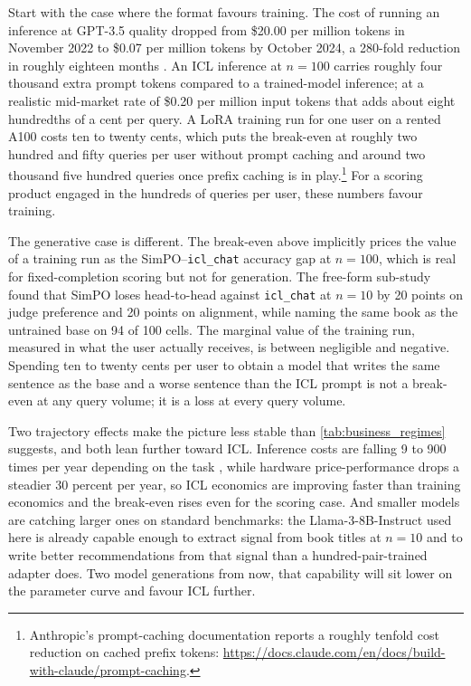 Start with the case where the format favours training. The cost of running an inference at GPT-3.5 quality dropped from \$20.00 per million tokens in November 2022 to \$0.07 per million tokens by October 2024, a 280-fold reduction in roughly eighteen months \citep{maslej2025aiindex}. An ICL inference at $n = 100$ carries roughly four thousand extra prompt tokens compared to a trained-model inference; at a realistic mid-market rate of \$0.20 per million input tokens that adds about eight hundredths of a cent per query. A LoRA training run for one user on a rented A100 costs ten to twenty cents, which puts the break-even at roughly two hundred and fifty queries per user without prompt caching and around two thousand five hundred queries once prefix caching is in play.\footnote{ Anthropic's prompt-caching documentation reports a roughly tenfold cost reduction on cached prefix tokens: \url{https://docs.claude.com/en/docs/build-with-claude/prompt-caching}.} For a scoring product engaged in the hundreds of queries per user, these numbers favour training.

The generative case is different. The break-even above implicitly prices the value of a training run as the SimPO--\texttt{icl\_chat} accuracy gap at $n = 100$, which is real for fixed-completion scoring but not for generation. The free-form sub-study found that SimPO loses head-to-head against \texttt{icl\_chat} at $n = 10$ by 20 points on judge preference and 20 points on alignment, while naming the same book as the untrained base on 94 of 100 cells. The marginal value of the training run, measured in what the user actually receives, is between negligible and negative. Spending ten to twenty cents per user to obtain a model that writes the same sentence as the base and a worse sentence than the ICL prompt is not a break-even at any query volume; it is a loss at every query volume.

Two trajectory effects make the picture less stable than \cref{tab:business_regimes} suggests, and both lean further toward ICL. Inference costs are falling 9 to 900 times per year depending on the task \citep{maslej2025aiindex}, while hardware price-performance drops a steadier 30 percent per year, so ICL economics are improving faster than training economics and the break-even rises even for the scoring case. And smaller models are catching larger ones on standard benchmarks: the Llama-3-8B-Instruct used here is already capable enough to extract signal from book titles at $n = 10$ and to write better recommendations from that signal than a hundred-pair-trained adapter does. Two model generations from now, that capability will sit lower on the parameter curve and favour ICL further.

